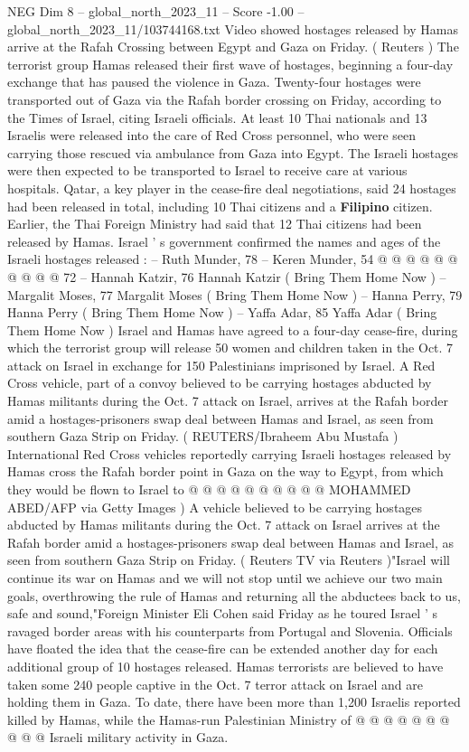 \begin{textsample}{NEG Dim 8 – global\_north\_2023\_11 – Score -1.00 – global\_north\_2023\_11/103744168.txt}  \label{ex:f8_neg_258}
Video showed hostages released by Hamas arrive at the Rafah Crossing between Egypt and Gaza on Friday. ( Reuters ) The terrorist group Hamas released their first wave of hostages, beginning a four-day exchange that has paused the violence in Gaza.
Twenty-four hostages were transported out of Gaza via the Rafah border crossing on Friday, according to the Times of Israel, citing Israeli officials.
At least 10 Thai nationals and 13 Israelis were released into the care of Red Cross personnel, who were seen carrying those rescued via ambulance from Gaza into Egypt.
The Israeli hostages were then expected to be transported to Israel to receive care at various hospitals.
Qatar, a key player in the cease-fire deal negotiations, said 24 hostages had been released in total, including 10 Thai citizens and a \textbf{Filipino} citizen.
Earlier, the Thai Foreign Ministry had said that 12 Thai citizens had been released by Hamas.
Israel ' s government confirmed the names and ages of the Israeli hostages released : -- Ruth Munder, 78 -- Keren Munder, 54 @ @ @ @ @ @ @ @ @ @ 72 -- Hannah Katzir, 76 Hannah Katzir ( Bring Them Home Now ) -- Margalit Moses, 77 Margalit Moses ( Bring Them Home Now ) -- Hanna Perry, 79 Hanna Perry ( Bring Them Home Now ) -- Yaffa Adar, 85 Yaffa Adar ( Bring Them Home Now ) Israel and Hamas have agreed to a four-day cease-fire, during which the terrorist group will release 50 women and children taken in the Oct. 7 attack on Israel in exchange for 150 Palestinians imprisoned by Israel.
A Red Cross vehicle, part of a convoy believed to be carrying hostages abducted by Hamas militants during the Oct. 7 attack on Israel, arrives at the Rafah border amid a hostages-prisoners swap deal between Hamas and Israel, as seen from southern Gaza Strip on Friday. ( REUTERS/Ibraheem Abu Mustafa ) International Red Cross vehicles reportedly carrying Israeli hostages released by Hamas cross the Rafah border point in Gaza on the way to Egypt, from which they would be flown to Israel to @ @ @ @ @ @ @ @ @ @ MOHAMMED ABED/AFP via Getty Images ) A vehicle believed to be carrying hostages abducted by Hamas militants during the Oct. 7 attack on Israel arrives at the Rafah border amid a hostages-prisoners swap deal between Hamas and Israel, as seen from southern Gaza Strip on Friday. ( Reuters TV via Reuters )"Israel will continue its war on Hamas and we will not stop until we achieve our two main goals, overthrowing the rule of Hamas and returning all the abductees back to us, safe and sound,"Foreign Minister Eli Cohen said Friday as he toured Israel ' s ravaged border areas with his counterparts from Portugal and Slovenia.
Officials have floated the idea that the cease-fire can be extended another day for each additional group of 10 hostages released.
Hamas terrorists are believed to have taken some 240 people captive in the Oct. 7 terror attack on Israel and are holding them in Gaza.
To date, there have been more than 1,200 Israelis reported killed by Hamas, while the Hamas-run Palestinian Ministry of @ @ @ @ @ @ @ @ @ @ Israeli military activity in Gaza.

\end{textsample}
